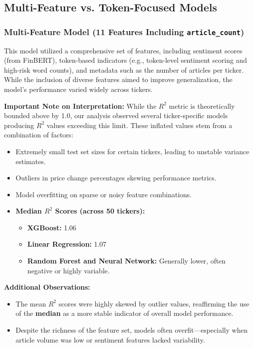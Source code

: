 \documentclass[twocolumn]{article}
\begin{document}
\subsection{Multi-Feature vs. Token-Focused Models}

\subsubsection{Multi-Feature Model (11 Features Including \texttt{article\_count})}

This model utilized a comprehensive set of features, including sentiment scores (from FinBERT), token-based indicators (e.g., token-level sentiment scoring and high-risk word counts), and metadata such as the number of articles per ticker. While the inclusion of diverse features aimed to improve generalization, the model's performance varied widely across tickers.

\textbf{Important Note on Interpretation:}  
While the $R^2$ metric is theoretically bounded above by 1.0, our analysis observed several ticker-specific models producing $R^2$ values exceeding this limit. These inflated values stem from a combination of factors:
\begin{itemize}
    \item Extremely small test set sizes for certain tickers, leading to unstable variance estimates.
    \item Outliers in price change percentages skewing performance metrics.
    \item Model overfitting on sparse or noisy feature combinations.
\end{itemize}

\begin{itemize}
    \item \textbf{Median $R^2$ Scores (across 50 tickers):}
    \begin{itemize}
        \item \textbf{XGBoost:} 1.06
        \item \textbf{Linear Regression:} 1.07
        \item \textbf{Random Forest and Neural Network:} Generally lower, often negative or highly variable.
    \end{itemize}
\end{itemize}

\textbf{Additional Observations:}
\begin{itemize}
    \item The mean $R^2$ scores were highly skewed by outlier values, reaffirming the use of the \textbf{median} as a more stable indicator of overall model performance.
    \item Despite the richness of the feature set, models often overfit—especially when article volume was low or sentiment features lacked variability.
\end{itemize}
\end{document}
